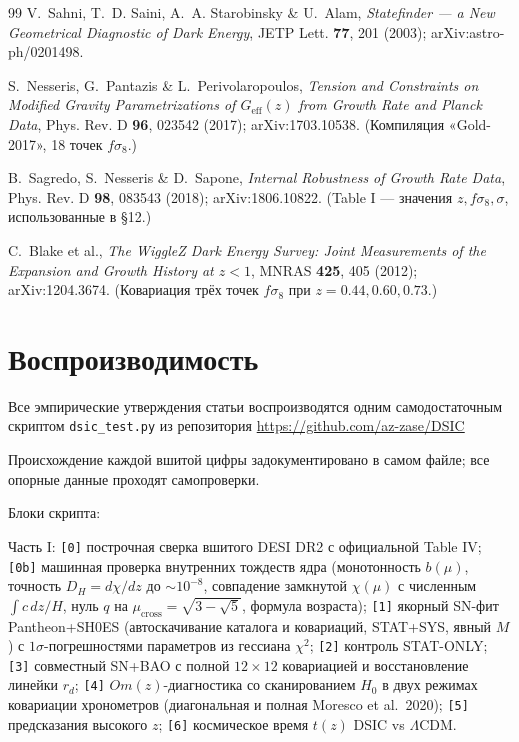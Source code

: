 \documentclass{article}
\begin{document}
\begin{thebibliography}{99}
 V.~Sahni, T.~D. Saini, A.~A. Starobinsky \& U.~Alam, \textit{Statefinder --- a New Geometrical Diagnostic of Dark Energy}, JETP Lett. \textbf{77}, 201 (2003); arXiv:astro-ph/0201498.

 S.~Nesseris, G.~Pantazis \& L.~Perivolaropoulos, \textit{Tension and Constraints on Modified Gravity Parametrizations of $G_{\text{eff}}(z)$ from Growth Rate and Planck Data}, Phys. Rev. D \textbf{96}, 023542 (2017); arXiv:1703.10538. (Компиляция «Gold-2017», 18 точек $f\sigma_8$.)

 B.~Sagredo, S.~Nesseris \& D.~Sapone, \textit{Internal Robustness of Growth Rate Data}, Phys. Rev. D \textbf{98}, 083543 (2018); arXiv:1806.10822. (Table I --- значения $z, f\sigma_8, \sigma$, использованные в \S12.)

 C.~Blake et al., \textit{The WiggleZ Dark Energy Survey: Joint Measurements of the Expansion and Growth History at $z < 1$}, MNRAS \textbf{425}, 405 (2012); arXiv:1204.3674. (Ковариация трёх точек $f\sigma_8$ при $z = 0.44, 0.60, 0.73$.)

\end{thebibliography}
\section*{Воспроизводимость}

Все эмпирические утверждения статьи воспроизводятся одним самодостаточным скриптом \texttt{dsic\_test.py} из репозитория \url{https://github.com/az-zase/DSIC}

Происхождение каждой вшитой цифры задокументировано в самом файле; все опорные данные проходят самопроверки.

Блоки скрипта:

Часть I: \texttt{[0]} построчная сверка вшитого DESI DR2 с официальной Table IV; \texttt{[0b]} машинная проверка внутренних тождеств ядра (монотонность $b(\mu)$, точность $D_H = d\chi/dz$ до ${\sim}10^{-8}$, совпадение замкнутой $\chi(\mu)$ с численным $\int c\, dz/H$, нуль $q$ на $\mu_{\text{cross}} = \sqrt{3-\sqrt{5}}$, формула возраста); \texttt{[1]} якорный SN-фит Pantheon+SH0ES (автоскачивание каталога и ковариаций, STAT+SYS, явный $M$) с $1\sigma$-погрешностями параметров из гессиана $\chi^2$; \texttt{[2]} контроль STAT-ONLY; \texttt{[3]} совместный SN+BAO с полной $12\times12$ ковариацией и восстановление линейки $r_d$; \texttt{[4]} $Om(z)$-диагностика со сканированием $H_0$ в двух режимах ковариации хронометров (диагональная и полная Moresco et al.\ 2020); \texttt{[5]} предсказания высокого $z$; \texttt{[6]} космическое время $t(z)$ DSIC vs $\Lambda$CDM.
\end{document}
